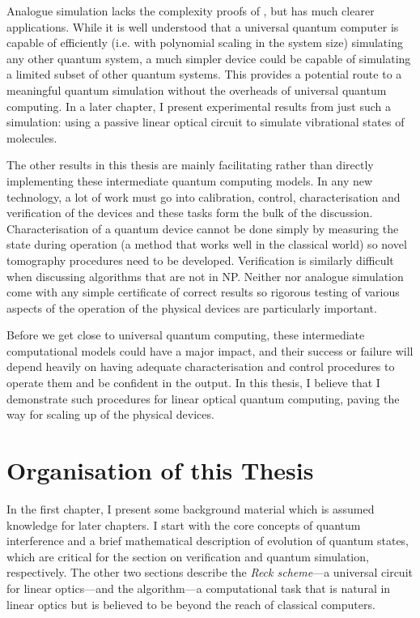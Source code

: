 Analogue simulation lacks the complexity proofs of \bosonsampling{}, but has
much clearer applications. While it is well understood that a universal quantum
computer is capable of efficiently (i.e. with polynomial scaling in the system
size) simulating any other quantum system, a much simpler device could be
capable of simulating a limited subset of other quantum systems. This provides a
potential route to a meaningful quantum simulation without the overheads of
universal quantum computing. In a later chapter, I present experimental results
from just such a simulation: using a passive linear optical circuit to simulate
vibrational states of molecules.

The other results in this thesis are mainly facilitating rather than directly
implementing these intermediate quantum computing models. In any new technology,
a lot of work must go into calibration, control, characterisation and
verification of the devices and these tasks form the bulk of the discussion.
Characterisation of a quantum device cannot be done simply by measuring the
state during operation (a method that works well in the classical world) so
novel tomography procedures need to be developed. Verification is similarly
difficult when discussing algorithms that are not in NP. Neither
\bosonsampling{} nor analogue simulation come with any simple certificate of
correct results so rigorous testing of various aspects of the operation of the
physical devices are particularly important.

Before we get close to universal quantum computing, these intermediate
computational models could have a major impact, and their success or failure
will depend heavily on having adequate characterisation and control procedures
to operate them and be confident in the output. In this thesis, I believe that I
demonstrate such procedures for linear optical quantum computing, paving the way
for scaling up of the physical devices.

\section{Organisation of this Thesis}
\label{sec:Organisation}
In the first chapter, I present some background material which is assumed
knowledge for later chapters. I start with the core concepts of quantum
interference and a brief mathematical description of evolution of quantum
states, which are critical for the section on verification and quantum
simulation, respectively. The other two sections describe the \emph{Reck
scheme}---a universal circuit for linear optics---and the \bosonsampling{}
algorithm---a computational task that is natural in linear optics but is
believed to be beyond the reach of classical computers.


